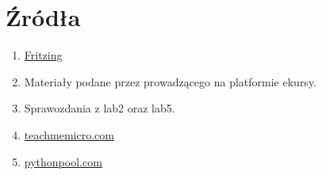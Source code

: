 \documentclass[polish,a4paper]{article}
\begin{document}
	
	\section*{Źródła}
	\begin{enumerate}
		\item \href{https://forum.fritzing.org/}{Fritzing}
		\item Materiały podane przez prowadzącego na platformie ekursy.
		\item Sprawozdania z lab2 oraz lab5.
		\item \href{https://www.teachmemicro.com/beaglebone-black-serial-arduino/}{teachmemicro.com} 
		\item \href{https://www.pythonpool.com/python-serial-read/}{pythonpool.com}
	\end{enumerate}
	\begingroup
	\hypersetup{hidelinks}
	\tableofcontents
	\endgroup
\end{document}
